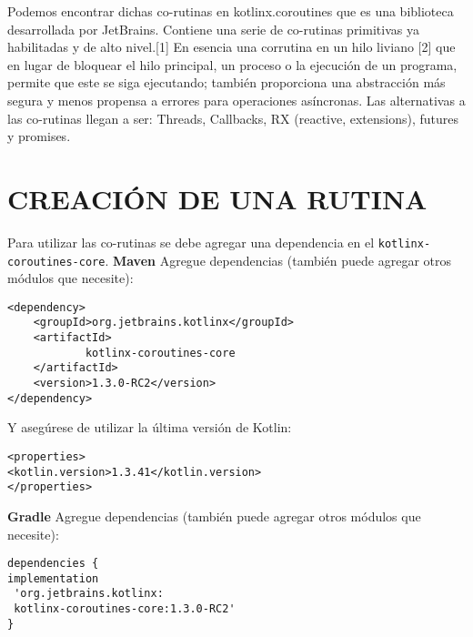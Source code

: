 \documentclass[twocolumn,10pt,abstract=on]{asme2ej}
\begin{document}
Podemos encontrar dichas co-rutinas en kotlinx.coroutines que es  una biblioteca desarrollada por JetBrains. Contiene una serie de  co-rutinas primitivas ya habilitadas y de alto nivel.[1]\linebreak\linebreak
En esencia una corrutina en un hilo liviano [2] que en lugar de bloquear el hilo principal, un proceso o la ejecución de un programa, permite que  este se siga ejecutando; también proporciona una abstracción más segura y menos propensa a errores para operaciones asíncronas. \linebreak\linebreak
Las alternativas a las co-rutinas llegan a ser: Threads, Callbacks, RX (reactive, extensions), futures y promises.


\section{CREACIÓN DE UNA RUTINA}
Para utilizar las co-rutinas se debe agregar una dependencia en el \verb+kotlinx-coroutines-core+.\linebreak\linebreak
\textbf{%
	\large {Maven}}
\linebreak
Agregue dependencias (también puede agregar otros módulos que necesite):

\begin{verbatim}
<dependency>                                                             
	<groupId>org.jetbrains.kotlinx</groupId>                              
	<artifactId>
			kotlinx-coroutines-core
	</artifactId>
	<version>1.3.0-RC2</version>
</dependency>
\end{verbatim}

Y asegúrese de utilizar la última versión de Kotlin:

\begin{verbatim}
<properties>
<kotlin.version>1.3.41</kotlin.version>
</properties>
\end{verbatim}

\smallbreak
\textbf{%
	\large {Gradle}}
\linebreak
Agregue dependencias (también puede agregar otros módulos que necesite):


\begin{verbatim}
dependencies {
implementation
 'org.jetbrains.kotlinx:
 kotlinx-coroutines-core:1.3.0-RC2'
}
\end{verbatim}
\end{document}
